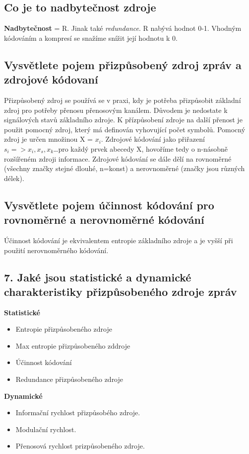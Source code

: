 \subsection{Co je to nadbytečnost zdroje }
\textbf{Nadbytečnost} = R.
Jinak také \textit{redundance}.
R nabývá hodnot 0-1.
Vhodným kódováním a kompresí se snažíme snížit její hodnotu k 0.

\subsection{Vysvětlete pojem přizpůsobený zdroj zpráv a zdrojové kódovaní}
Přizpůsobený zdroj se používá se v praxi, kdy je potřeba přizpůsobit základní zdroj pro potřeby přenosu přenosovým kanálem.
Důvodem je nedostate k signálových stavů základního zdroje. K přízpůsobení zdroje na další přenost je použit pomocný zdroj, který má definován vyhovující počet symbolů. Pomocný zdroj je určen množinou X = ${x_i}$.
Zdrojové kódování jako přiřazení $s_i => x_i,x_s,x_k$\dots pro každý prvek abecedy X, hovoříme tedy o n-násobně rozšířeném zdroji informace. Zdrojové kódování se dále dělí na rovnoměrné (všechny značky stejné dlouhé, n=konst) a nerovnoměrné (značky jsou různých délek).

\subsection{Vysvětlete pojem účinnost kódování pro rovnoměrné a nerovnoměrné kódování}
Účinnost kódování je ekvivalentem entropie základního zdroje a je vyšší při použití nerovnoměrného kódování.

\subsection{7.	Jaké jsou statistické a dynamické charakteristiky přizpůsobeného zdroje zpráv}
\textbf{Statistické}
\begin{itemize}
    \item Entropie přizpůsobeného zdroje
    \item Max entropie přizpůsobeného zddroje
    \item Účinnost kódování
    \item Redundance přizpůsobeného zdroje
\end{itemize}
\textbf{Dynamické}
\begin{itemize}
    \item Informační rychlost přizpůsobého zdroje.
    \item Modulační rychlost.
    \item Přenosová rychlost prizpůsobeného zdroje.
    
\end{itemize}

